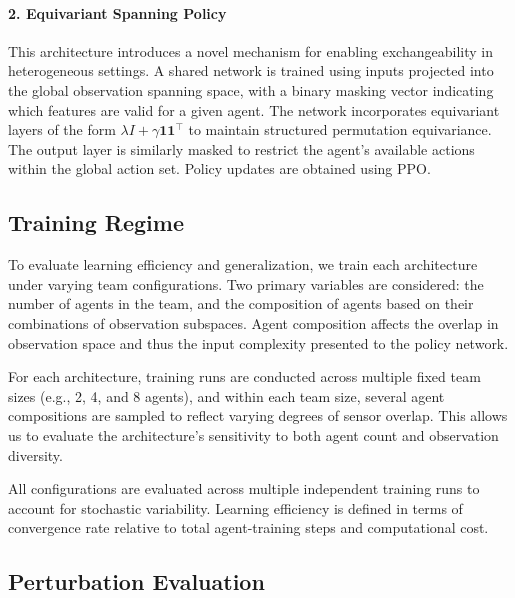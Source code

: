 \documentclass{article}
\begin{document}
\paragraph{2. Equivariant Spanning Policy}
This architecture introduces a novel mechanism for enabling 
exchangeability in heterogeneous settings. A shared network 
is trained using inputs projected into the global observation 
spanning space, with a binary masking vector indicating which 
features are valid for a given agent. The network incorporates 
equivariant layers of the form $\lambda I + \gamma \mathbf{11}^\top$ 
to maintain structured permutation equivariance. The output layer 
is similarly masked to restrict the agent's available actions 
within the global action set. Policy updates are obtained using PPO.


\subsection{Training Regime}

To evaluate learning efficiency and generalization, 
we train each architecture under varying team configurations. 
Two primary variables are considered: the number of agents in the team, 
and the composition of agents based on their combinations of observation subspaces. 
Agent composition affects the overlap in observation space and thus 
the input complexity presented to the policy network. 

For each architecture, training runs are conducted across multiple 
fixed team sizes (e.g., 2, 4, and 8 agents), and within each team size, 
several agent compositions are sampled to reflect varying degrees of sensor overlap. 
This allows us to evaluate the architecture's sensitivity to 
both agent count and observation diversity.

All configurations are evaluated across multiple independent 
training runs to account for stochastic variability.
Learning efficiency is defined in terms of convergence rate 
relative to total agent-training steps and computational cost.

\subsection{Perturbation Evaluation}
\end{document}
